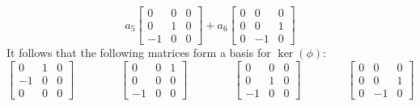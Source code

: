 \documentclass{amsart}
\newcommand{\bbm}       {\left[\begin{matrix}}
\newcommand{\ebm}       {\end{matrix}\right]}
\renewcommand{\:}       {\colon}
\theoremstyle{definition}
\renewenvironment{solution}{\SolutionAtEnd}{\endSolutionAtEnd}
\begin{document}
\begin{solution}
{\[   a_5 \bbm 0&0&0\\ 0&1&0\\ -1&0&0 \ebm + 
   a_6 \bbm 0&0&0\\ 0&0&1\\ 0&-1&0 \ebm
 \]}
 It follows that the following matrices form a basis for
 $\ker(\phi)$:
 {\tiny \[
  \bbm 0&1&0\\ -1&0&0\\ 0&0&0 \ebm \hspace{4em}
  \bbm 0&0&1\\ 0&0&0\\ -1&0&0 \ebm \hspace{4em}
  \bbm 0&0&0\\ 0&1&0\\ -1&0&0 \ebm \hspace{4em}
  \bbm 0&0&0\\ 0&0&1\\ 0&-1&0 \ebm
 \]}
\end{solution}
\end{document}
